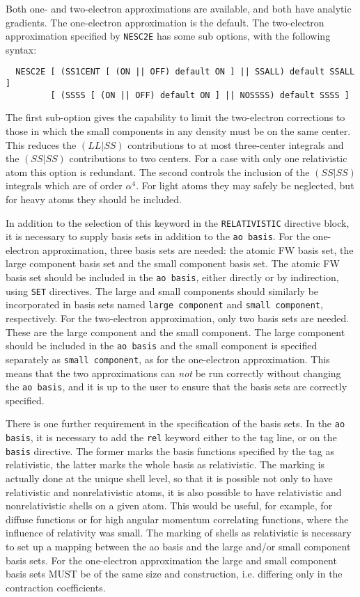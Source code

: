 Both one- and two-electron approximations are available, and both have
analytic gradients. The one-electron approximation is the default.
The two-electron approximation specified by \verb+NESC2E+ has some sub
options, with the following syntax:

\begin{verbatim}
  NESC2E [ (SS1CENT [ (ON || OFF) default ON ] || SSALL) default SSALL ]
         [ (SSSS [ (ON || OFF) default ON ] || NOSSSS) default SSSS ]

\end{verbatim}

The first sub-option gives the capability to limit the two-electron
corrections to those in which the small components in any density must be on
the same center.  This reduces the $(LL|SS)$ contributions to at most
three-center integrals and the $(SS|SS)$ contributions to two centers. For a
case with only one relativistic atom this option is redundant. The second
controls the inclusion of the $(SS|SS)$ integrals which are of order
$\alpha^4$. For light atoms they may safely be neglected, but for heavy
atoms they should be included. 

In addition to the selection of this keyword in the \verb+RELATIVISTIC+
directive block, it is necessary to supply basis sets in addition to the
\verb+ao basis+. For the one-electron approximation, three basis sets are
needed: the atomic FW basis set, the large component basis set and the small
component basis set. The atomic FW basis set should be included in the
\verb+ao basis+, either directly or by indirection, using \verb+SET+
directives.  The large and small components should similarly be incorporated
in basis sets named \verb+large component+ and \verb+small component+,
respectively. For the two-electron approximation, only two basis sets are
needed. These are the large component and the small component. The large component
should be included in the \verb+ao basis+ and the small component
is specified separately as \verb+small component+, as for the one-electron
approximation. This means that the two approximations can {\it not} be run
correctly without changing the \verb+ao basis+, and it is up to the user to
ensure that the basis sets are correctly specified.

There is one further requirement in the specification of the basis sets. In
the \verb+ao basis+, it is necessary to add the \verb+rel+ keyword either to the
tag line, or on the \verb+basis+ directive. The former marks the basis
functions specified by the tag as relativistic, the latter marks the whole
basis as relativistic. The marking is actually done at the unique shell
level, so that it is possible not only to have relativistic and
nonrelativistic atoms, it is also possible to have relativistic and
nonrelativistic shells on a given atom. This would be useful, for example,
for diffuse functions or for high angular momentum correlating functions,
where the influence of relativity was small. The marking of shells as
relativistic is necessary to set up a mapping between the ao basis and the
large and/or small component basis sets. For the one-electron approximation
the large and small component basis sets MUST be of the same size and
construction, i.e. differing only in the contraction coefficients.


